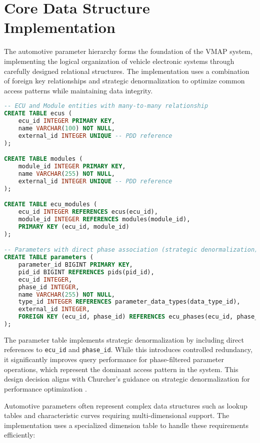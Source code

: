 \section{Core Data Structure Implementation}
\label{sec:core-data-structure}

The automotive parameter hierarchy forms the foundation of the \ac{VMAP} system, implementing the logical organization of vehicle electronic systems through carefully designed relational structures. The implementation uses a combination of foreign key relationships and strategic denormalization to optimize common access patterns while maintaining data integrity.

\begin{lstlisting}[language=SQL, caption={Core Parameter Hierarchy Implementation}, label={lst:parameter-hierarchy}]
-- ECU and Module entities with many-to-many relationship
CREATE TABLE ecus (
    ecu_id INTEGER PRIMARY KEY,
    name VARCHAR(100) NOT NULL,
    external_id INTEGER UNIQUE -- PDD reference
);

CREATE TABLE modules (
    module_id INTEGER PRIMARY KEY,
    name VARCHAR(255) NOT NULL,
    external_id INTEGER UNIQUE -- PDD reference
);

CREATE TABLE ecu_modules (
    ecu_id INTEGER REFERENCES ecus(ecu_id),
    module_id INTEGER REFERENCES modules(module_id),
    PRIMARY KEY (ecu_id, module_id)
);

-- Parameters with direct phase association (strategic denormalization)
CREATE TABLE parameters (
    parameter_id BIGINT PRIMARY KEY,
    pid_id BIGINT REFERENCES pids(pid_id),
    ecu_id INTEGER,
    phase_id INTEGER,
    name VARCHAR(255) NOT NULL,
    type_id INTEGER REFERENCES parameter_data_types(data_type_id),
    external_id INTEGER,
    FOREIGN KEY (ecu_id, phase_id) REFERENCES ecu_phases(ecu_id, phase_id)
);
\end{lstlisting}

The parameter table implements strategic denormalization by including direct references to \texttt{ecu\_id} and \texttt{phase\_id}. While this introduces controlled redundancy, it significantly improves query performance for phase-filtered parameter operations, which represent the dominant access pattern in the system. This design decision aligns with Churcher's guidance on strategic denormalization for performance optimization \cite{churcher2008beginning}.

Automotive parameters often represent complex data structures such as lookup tables and characteristic curves requiring multi-dimensional support. The implementation uses a specialized dimension table to handle these requirements efficiently:


